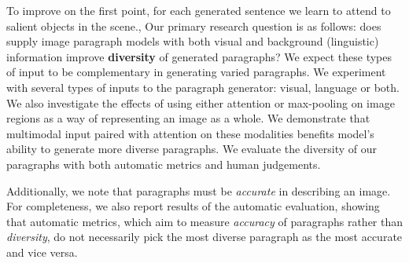 \documentclass[11pt,a4paper]{article}
\begin{document}
To improve on the first point, for each generated sentence we learn to attend to salient objects in the scene.,
Our primary research question is as follows: does supply image paragraph models with both visual and background (linguistic) information improve \textbf{diversity} of generated paragraphs?
We expect these types of input to be complementary in generating varied paragraphs.
We experiment with several types of inputs to the paragraph generator: visual, language or both.
We also investigate the effects of using either attention or max-pooling on image regions as a way of representing an image as a whole.
We demonstrate that multimodal input paired with attention on these modalities benefits model's ability to generate more diverse paragraphs.
We evaluate the diversity of our paragraphs with both automatic metrics and human judgements.

Additionally, we note that paragraphs must be \textit{accurate} in describing an image.
For completeness, we also report results of the automatic evaluation, showing that automatic metrics, which aim to measure \textit{accuracy} of paragraphs rather than \textit{diversity}, do not necessarily pick the most diverse paragraph as the most accurate and vice versa.
\end{document}
